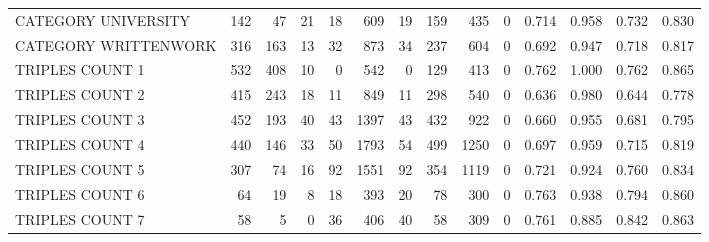\begin{tabular}{lrrrrrrrrrllll}
 CATEGORY UNIVERSITY      &             142 &            47 &              21 &              18 &             609 &   19 &  159 &  435 &    0 & 0.714 & 0.958 & 0.732 & 0.830 \\
 CATEGORY WRITTENWORK     &             316 &           163 &              13 &              32 &             873 &   34 &  237 &  604 &    0 & 0.692 & 0.947 & 0.718 & 0.817 \\
 TRIPLES COUNT 1          &             532 &           408 &              10 &               0 &             542 &    0 &  129 &  413 &    0 & 0.762 & 1.000 & 0.762 & 0.865 \\
 TRIPLES COUNT 2          &             415 &           243 &              18 &              11 &             849 &   11 &  298 &  540 &    0 & 0.636 & 0.980 & 0.644 & 0.778 \\
 TRIPLES COUNT 3          &             452 &           193 &              40 &              43 &            1397 &   43 &  432 &  922 &    0 & 0.660 & 0.955 & 0.681 & 0.795 \\
 TRIPLES COUNT 4          &             440 &           146 &              33 &              50 &            1793 &   54 &  499 & 1250 &    0 & 0.697 & 0.959 & 0.715 & 0.819 \\
 TRIPLES COUNT 5          &             307 &            74 &              16 &              92 &            1551 &   92 &  354 & 1119 &    0 & 0.721 & 0.924 & 0.760 & 0.834 \\
 TRIPLES COUNT 6          &              64 &            19 &               8 &              18 &             393 &   20 &   78 &  300 &    0 & 0.763 & 0.938 & 0.794 & 0.860 \\
 TRIPLES COUNT 7          &              58 &             5 &               0 &              36 &             406 &   40 &   58 &  309 &    0 & 0.761 & 0.885 & 0.842 & 0.863 \\
\hline
\end{tabular}